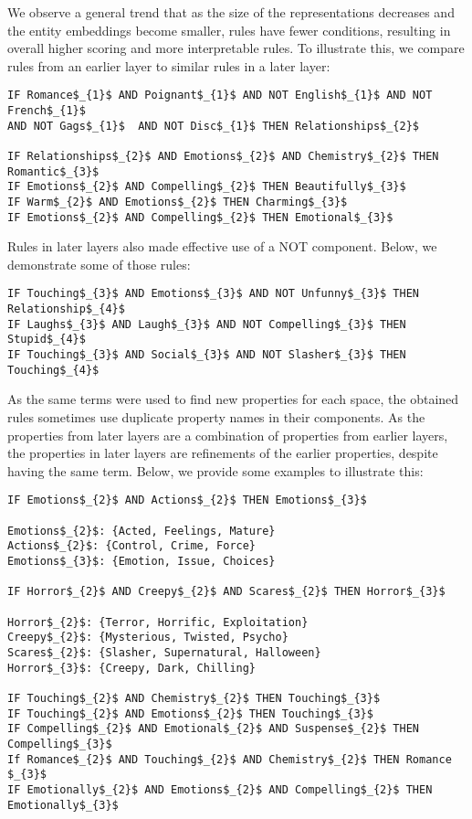 We observe a general trend that as the size of the representations decreases and the entity embeddings become smaller, rules have fewer conditions, resulting in overall higher scoring and more interpretable rules. To illustrate this, we compare rules from an earlier layer to similar rules in a later layer: %

\begin{lstlisting}[mathescape=true]
IF Romance$_{1}$ AND Poignant$_{1}$ AND NOT English$_{1}$ AND NOT French$_{1}$
AND NOT Gags$_{1}$  AND NOT Disc$_{1}$ THEN Relationships$_{2}$

IF Relationships$_{2}$ AND Emotions$_{2}$ AND Chemistry$_{2}$ THEN Romantic$_{3}$
IF Emotions$_{2}$ AND Compelling$_{2}$ THEN Beautifully$_{3}$ 
IF Warm$_{2}$ AND Emotions$_{2}$ THEN Charming$_{3}$ 
IF Emotions$_{2}$ AND Compelling$_{2}$ THEN Emotional$_{3}$ 
\end{lstlisting}

Rules in later layers also made effective use of a NOT component. Below, we demonstrate some of those rules:

\begin{lstlisting}[mathescape=true]
IF Touching$_{3}$ AND Emotions$_{3}$ AND NOT Unfunny$_{3}$ THEN  Relationship$_{4}$ 
IF Laughs$_{3}$ AND Laugh$_{3}$ AND NOT Compelling$_{3}$ THEN  Stupid$_{4}$
IF Touching$_{3}$ AND Social$_{3}$ AND NOT Slasher$_{3}$ THEN  Touching$_{4}$
\end{lstlisting}

As the same terms were used to find new properties for each space, the obtained rules sometimes use duplicate property names in their components. As the properties from later layers are a combination of properties from earlier layers, the properties in later layers are refinements of the earlier properties, despite having the same term. Below, we provide some examples to illustrate this:

\begin{lstlisting}[mathescape=true]
IF Emotions$_{2}$ AND Actions$_{2}$ THEN Emotions$_{3}$ 

Emotions$_{2}$: {Acted, Feelings, Mature}
Actions$_{2}$: {Control, Crime, Force}
Emotions$_{3}$: {Emotion, Issue, Choices}

IF Horror$_{2}$ AND Creepy$_{2}$ AND Scares$_{2}$ THEN Horror$_{3}$

Horror$_{2}$: {Terror, Horrific, Exploitation}
Creepy$_{2}$: {Mysterious, Twisted, Psycho}
Scares$_{2}$: {Slasher, Supernatural, Halloween}
Horror$_{3}$: {Creepy, Dark, Chilling}

IF Touching$_{2}$ AND Chemistry$_{2}$ THEN Touching$_{3}$ 
IF Touching$_{2}$ AND Emotions$_{2}$ THEN Touching$_{3}$ 
IF Compelling$_{2}$ AND Emotional$_{2}$ AND Suspense$_{2}$ THEN Compelling$_{3}$
If Romance$_{2}$ AND Touching$_{2}$ AND Chemistry$_{2}$ THEN Romance $_{3}$ 
IF Emotionally$_{2}$ AND Emotions$_{2}$ AND Compelling$_{2}$ THEN Emotionally$_{3}$ 
\end{lstlisting}



